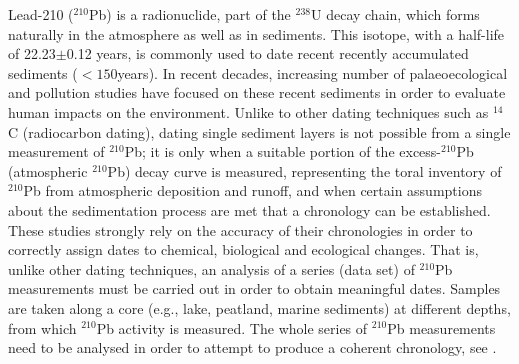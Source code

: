 \documentclass [10pt] {article}
\begin{document}
Lead-210 ($^{210}$Pb) is a radionuclide, part of the $^{238}$U decay chain, which forms naturally in the atmosphere as well as in sediments.
This isotope, with a half-life of 22.23$\pm$0.12 years, is commonly used to date recent recently accumulated sediments ($<150$years). 
In recent decades, increasing number of palaeoecological and pollution studies have focused on these recent sediments \citep[e.g.,][]{Courtney2019} in order to evaluate human impacts on the environment.
Unlike to other dating techniques such as $^{14}$C (radiocarbon dating), dating single sediment layers is not possible from a single measurement of $^{210}$Pb; it is only when a suitable portion of the excess-$^{210}$Pb (atmospheric $^{210}$Pb) decay curve is measured, representing the toral inventory of $^{210}$Pb from atmospheric deposition and runoff, and when certain assumptions about the sedimentation process are met that a chronology can be established.  
These studies strongly rely on the accuracy of their chronologies in order to correctly assign dates to chemical, biological and ecological changes.
That is, unlike other dating techniques, an analysis of a series (data set) of $^{210}$Pb measurements must be carried out in order to obtain meaningful dates.  Samples are taken along a core (e.g., lake, peatland, marine sediments) at different depths, from which $^{210}$Pb activity is measured.  
The whole series of $^{210}$Pb measurements need to be analysed in order to attempt to produce a coherent chronology, see \citet{Aquino2018}.
\end{document}
